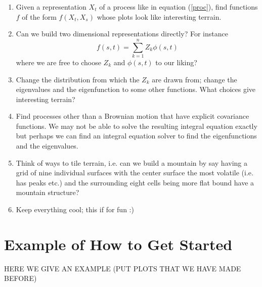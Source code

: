 \documentclass{amsart}
\begin{document}
\begin{enumerate}
    \item Given a representation $X_t$ of a process like in equation (\ref{proc}), 
        find functions $f$ of the form $f(X_t,X_s)$ whose plots look like interesting 
        terrain.
    \item Can we build two dimensional representations directly?  For instance 
    $$
    f(s,t) = \sum_{k=1}^n Z_k \phi(s,t)
    $$
        where we are free to choose $Z_k$ and $\phi(s,t)$ to our liking?
    \item Change the distribution from which the $Z_k$ are drawn from; change the 
        eigenvalues and the eigenfunction to some other functions.  What choices give 
        interesting terrain?
    \item Find processes other than a Brownian motion that have explicit covariance 
        functions.  We may not be able to solve the resulting integral equation exactly
        but perhaps we can find an integral equation solver to find the eigenfunctions 
        and the eigenvalues. 
    \item Think of ways to tile terrain, i.e. can we build a mountain by say 
        having a grid of nine individual surfaces with the center surface the most 
        volatile (i.e. has peaks etc.) and the surrounding eight cells being 
        more flat bound have a mountain structure? 
    \item Keep everything cool; this if for fun :) 
\end{enumerate}

\section{Example of How to Get Started}

HERE WE GIVE AN EXAMPLE (PUT PLOTS THAT WE HAVE MADE BEFORE)
\end{document}

